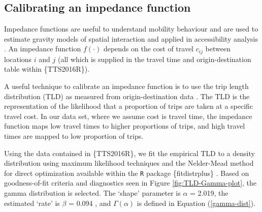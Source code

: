 \documentclass[Royal,times,sageh]{sagej}
\begin{document}
\hypertarget{calibrating-an-impedance-function}{%
\subsection{Calibrating an impedance
function}\label{calibrating-an-impedance-function}}

Impedance functions are useful to understand mobility behaviour and are
used to estimate gravity models of spatial interaction
\citep{wilson1971, haynes_gravity_1985} and applied in accessibility
analysis
\citep{hansen_how_1959, talen_assessing_1998, paez_jobs_2013, barboza_balancing_2021}.
An impedance function \(f(\cdot)\) depends on the cost of travel
\(c_{ij}\) between locations \(i\) and \(j\) (all which is supplied in
the travel time and origin-destination table within \{TTS2016R\}).

A useful technique to calibrate an impedance function is to use the trip
length distribution (TLD) as measured from origin-destination data
\citep{horbachov_theoretical_2018, batista_estimation_2019}. The TLD is
the representation of the likelihood that a proportion of trips are
taken at a specific travel cost. In our data set, where we assume cost
is travel time, the impedance function maps low travel times to higher
proportions of trips, and high travel times are mapped to low proportion
of trips.

Using the data contained in \{TTS2016R\}, we fit the empirical TLD to a
density distribution using maximum likelihood techniques and the
Nelder-Mead method for direct optimization available within the
\texttt{R} package \{fitdistrplus\} \citep{fitdistrplus_2015}. Based on
goodness-of-fit criteria and diagnostics seen in Figure
\ref{fig:TLD-Gamma-plot}, the gamma distribution is selected. The
`shape' parameter is \(\alpha\) = 2.019, the estimated `rate' is
\(\beta\) = 0.094 , and \(\Gamma(\alpha)\) is defined in Equation
(\ref{gamma-dist}).
\end{document}
